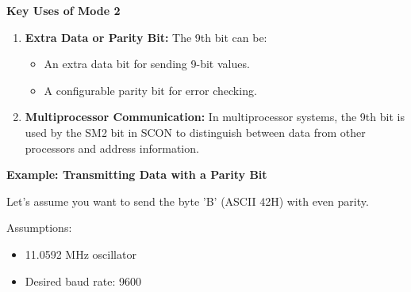 \documentclass[
]{article}
\begin{document}
\textbf{Key Uses of Mode 2}

\begin{enumerate}
\def\labelenumi{\arabic{enumi}.}
\item
  \textbf{Extra Data or Parity Bit:} The 9th bit can be:

  \begin{itemize}
  \item
    An extra data bit for sending 9-bit values.
  \item
    A configurable parity bit for error checking.
  \end{itemize}
\item
  \textbf{Multiprocessor Communication:} In multiprocessor systems, the
  9th bit is used by the SM2 bit in SCON to distinguish between data
  from other processors and address information.
\end{enumerate}

\textbf{Example: Transmitting Data with a Parity Bit}

Let's assume you want to send the byte 'B' (ASCII 42H) with even parity.

Assumptions:

\begin{itemize}
\item
  11.0592 MHz oscillator
\item
  Desired baud rate: 9600
\end{itemize}
\end{document}
